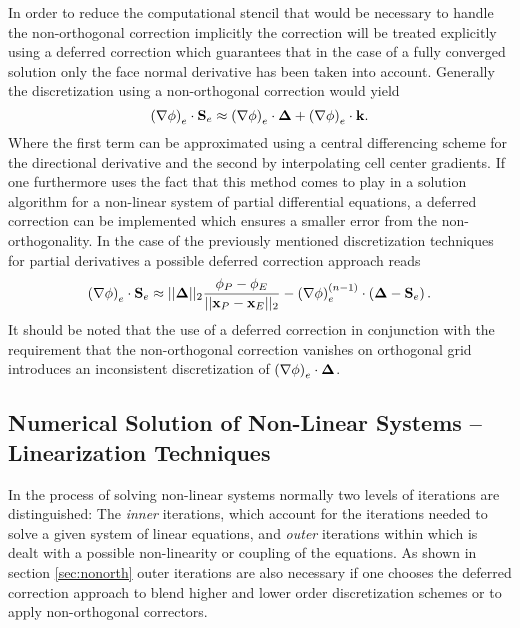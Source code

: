 In order to reduce the computational stencil that would be necessary to handle the non-orthogonal correction implicitly the correction will be treated explicitly using a deferred correction which guarantees that in the case of a fully converged solution only the face normal derivative has been taken into account. Generally the discretization using a non-orthogonal correction would yield 
\begin{displaymath}
  \left( \nabla \phi \right)_e \cdot \mathbf{S}_e \approx \left(\nabla \phi \right)_e \cdot \boldsymbol{\Delta} + \left( \nabla \phi \right)_e \cdot \mathbf{k}.
\end{displaymath}
Where the first term can be approximated using a central differencing scheme for the directional derivative and the second by interpolating cell center gradients. If one furthermore uses the fact that this method comes to play in a solution algorithm for a non-linear system of partial differential equations, a deferred correction can be implemented which ensures a smaller error from the non-orthogonality. In the case of the previously mentioned discretization techniques for partial derivatives a possible deferred correction approach reads
\begin{displaymath}
  \left( \nabla \phi \right)_e \cdot \mathbf{S}_e \approx ||\boldsymbol{\Delta}||_2 \frac{\phi_P - \phi_E}{||\mathbf{x}_P - \mathbf{x}_E||_2} - \left(\nabla \phi \right)_e^{(n-1)} \cdot \left(\boldsymbol{\Delta} - \mathbf{S}_e \right).
\end{displaymath}
It should be noted that the use of a deferred correction in conjunction with the requirement that the non-orthogonal correction vanishes on orthogonal grid introduces an inconsistent discretization of \( \left(\nabla \phi \right)_e \cdot \boldsymbol{\Delta} \).

\subsection{Numerical Solution of Non-Linear Systems -- Linearization Techniques}
\label{sec:nonlinear}

In the process of solving non-linear systems normally two levels of iterations are distinguished: The \emph{inner} iterations, which account for the iterations needed to solve a given system of linear equations, and \emph{outer} iterations within which is dealt with a possible non-linearity or coupling of the equations. As shown in section \ref{sec:nonorth} outer iterations are also necessary if one chooses the deferred correction approach to blend higher and lower order discretization schemes or to apply non-orthogonal correctors.

